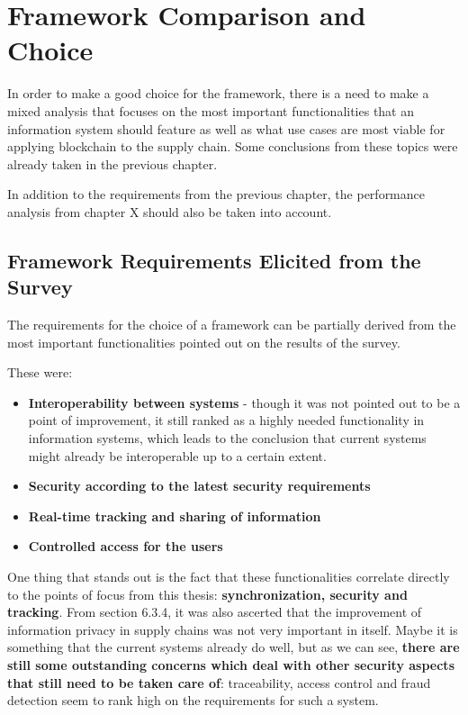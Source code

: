 
\section{Framework Comparison and Choice}

In order to make a good choice for the framework, there is a need to make a mixed analysis that focuses on the most important functionalities that an information system should feature as well as what use cases are most viable for applying blockchain to the supply chain. Some conclusions from these topics were already taken in the previous chapter. %

In addition to the requirements from the previous chapter, the performance analysis from chapter X should also be taken into account. %

\subsection{Framework Requirements Elicited from the Survey}

The requirements for the choice of a framework can be partially derived from the most important functionalities pointed out on the results of the survey.


These were:
\begin{itemize}
	\item \textbf{Interoperability between systems} - though it was not pointed out to be a point of improvement, it still ranked as a highly needed functionality in information systems, which leads to the conclusion that current systems might already be interoperable up to a certain extent.
	\item \textbf{Security according to the latest security requirements}
	\item \textbf{Real-time tracking and sharing of information}
	\item \textbf{Controlled access for the users}
\end{itemize}


One thing that stands out is the fact that these functionalities correlate directly to the points of focus from this thesis: \textbf{synchronization, security and tracking}.  From section 6.3.4, it was also ascerted that the improvement of information privacy in supply chains was not very important in itself. Maybe it is something that the current systems already do well, but as we can see, \textbf{there are still some outstanding concerns which deal with other security aspects that still need to be taken care of}: traceability, access control and fraud detection seem to rank high on the requirements for such a system.

